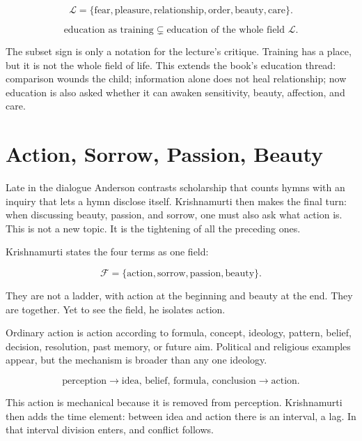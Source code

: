 \documentclass[11pt,oneside]{book}
\begin{document}
\begin{equation}
\mathcal{L}
=
\{\text{fear},\text{pleasure},\text{relationship},\text{order},
\text{beauty},\text{care}\}.
\end{equation}

\begin{equation}
\text{education as training}
\subsetneq
\text{education of the whole field } \mathcal{L}.
\end{equation}

The subset sign is only a notation for the lecture's critique. Training has a place, but it is not the whole field of life. This extends the book's education thread: comparison wounds the child; information alone does not heal relationship; now education is also asked whether it can awaken sensitivity, beauty, affection, and care.

\section{Action, Sorrow, Passion, Beauty}

Late in the dialogue Anderson contrasts scholarship that counts hymns with an inquiry that lets a hymn disclose itself. Krishnamurti then makes the final turn: when discussing beauty, passion, and sorrow, one must also ask what action is. This is not a new topic. It is the tightening of all the preceding ones.

Krishnamurti states the four terms as one field:

\begin{equation}
\mathcal{F}
=
\{\text{action},\text{sorrow},\text{passion},\text{beauty}\}.
\end{equation}

They are not a ladder, with action at the beginning and beauty at the end. They are together. Yet to see the field, he isolates action.

Ordinary action is action according to formula, concept, ideology, pattern, belief, decision, resolution, past memory, or future aim. Political and religious examples appear, but the mechanism is broader than any one ideology.

\begin{equation}
\text{perception}
\longrightarrow
\text{idea, belief, formula, conclusion}
\longrightarrow
\text{action}.
\end{equation}

This action is mechanical because it is removed from perception. Krishnamurti then adds the time element: between idea and action there is an interval, a lag. In that interval division enters, and conflict follows.
\end{document}
